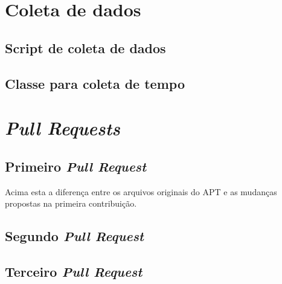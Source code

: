 \begin{apendicesenv}

\partapendices

\chapter{Coleta de dados} %
\label{cha:coleta_de_dados}

\section{Script de coleta de dados}
	

\section{Classe para coleta de tempo}
	


\chapter{\textit{Pull Requests}}
\label{cha:pull_requests}

\section{Primeiro \textit{Pull Request}}
\label{sec:primeiro_pr}
	

Acima esta a diferença entre os arquivos originais do APT e as mudanças propostas na primeira contribuição.


\section{Segundo \textit{Pull Request}}
\label{sec:segundo_pr}
	


\section{Terceiro \textit{Pull Request}}
\label{sec:segundo_pr}
	




\end{apendicesenv}
